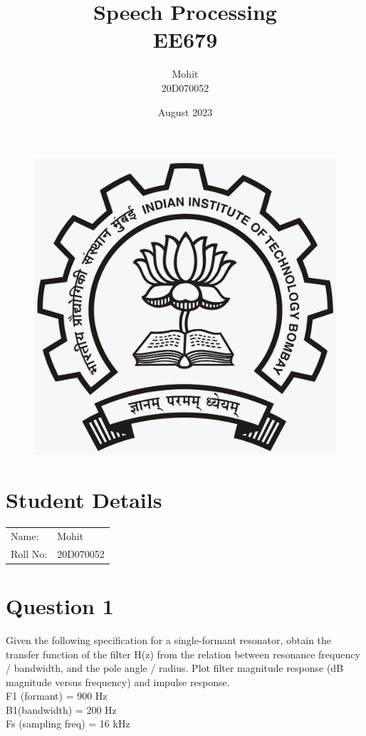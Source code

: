 \documentclass{article}
\title{Speech Processing\\EE679}
\author{Mohit\\20D070052 }
\date{August 2023}
\begin{document}
\maketitle
\begin{figure}[H]
\begin{center}
\includegraphics[scale = 0.2]{LOGO.jpeg}
\end{center}
\end{figure}
\section{Student Details}
\begin{tabular}{ l l  }
 Name: & Mohit \\ 
 Roll No: & 20D070052  \\  
\end{tabular}

\newpage

\section{Question 1}

Given the following specification for a single-formant resonator, obtain the transfer function of the filter H(z) from the relation between resonance frequency / bandwidth, and the pole angle / radius. Plot filter magnitude response (dB magnitude versus frequency) and impulse response.\\
F1 (formant) = 900 Hz \\
B1(bandwidth) = 200 Hz \\
Fs (sampling freq) = 16 kHz \\
\end{document}
